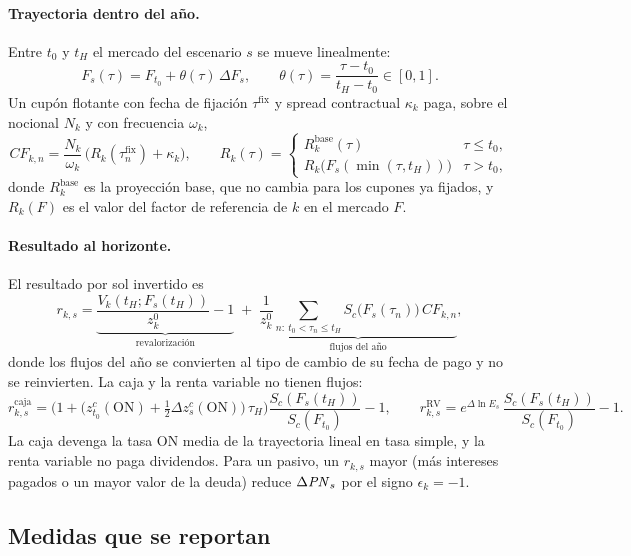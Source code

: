 \paragraph{Trayectoria dentro del año.} Entre $t_0$ y $t_H$ el mercado del escenario $s$ se mueve
linealmente:
\[
  F_s(\tau) = F_{t_0} + \theta(\tau)\,\Delta F_s, \qquad \theta(\tau) = \frac{\tau - t_0}{t_H - t_0} \in [0, 1].
\]
Un cupón flotante con fecha de fijación $\tau^{\text{fix}}$ y spread contractual $\kappa_k$ paga, sobre el
nocional $N_k$ y con frecuencia $\omega_k$,
\[
  CF_{k,n} = \frac{N_k}{\omega_k}\,\big(R_k(\tau^{\text{fix}}_n) + \kappa_k\big), \qquad
  R_k(\tau) = \begin{cases}
    R_k^{\text{base}}(\tau) & \tau \le t_0,\\
    R_k\big(F_s(\min(\tau, t_H))\big) & \tau > t_0,
  \end{cases}
\]
donde $R_k^{\text{base}}$ es la proyección base, que no cambia para los cupones ya fijados, y $R_k(F)$ es el
valor del factor de referencia de $k$ en el mercado $F$.

\paragraph{Resultado al horizonte.} El resultado por sol invertido es
\begin{equation}
  r_{k,s} = \underbrace{\frac{V_k(t_H; F_s(t_H))}{z_k^0} - 1}_{\text{revalorización}}
  \;+\; \underbrace{\frac{1}{z_k^0} \sum_{n:\ t_0 < \tau_n \le t_H} S_c\big(F_s(\tau_n)\big)\, CF_{k,n}}_{\text{flujos del año}},
\end{equation}
donde los flujos del año se convierten al tipo de cambio de su fecha de pago y no se reinvierten. La caja y
la renta variable no tienen flujos:
\[
  r_{k,s}^{\text{caja}} = \Big(1 + \big(z^c_{t_0}(\text{ON}) + \tfrac{1}{2}\Delta z^c_s(\text{ON})\big)\,\tau_H\Big)\frac{S_c(F_s(t_H))}{S_c(F_{t_0})} - 1,
  \qquad
  r_{k,s}^{\text{RV}} = e^{\Delta \ln E_s}\,\frac{S_c(F_s(t_H))}{S_c(F_{t_0})} - 1 .
\]
La caja devenga la tasa ON media de la trayectoria lineal en tasa simple, y la renta variable no paga
dividendos. Para un pasivo, un $r_{k,s}$ mayor (más intereses pagados o un mayor valor de la deuda) reduce
$\Delta\mathit{PN}_s$ por el signo $\epsilon_k = -1$.

\subsection{Medidas que se reportan}
